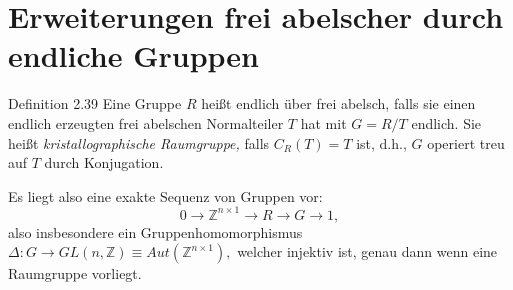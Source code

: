 \documentclass{beamer}
\begin{document}
\section{Erweiterungen frei abelscher durch endliche Gruppen}
\begin{frame}
\begin{block}{Definition 2.39}
Eine Gruppe $R$ heißt endlich über frei abelsch, falls sie einen endlich erzeugten frei abelschen Normalteiler $T$ hat mit $G=R/ T$ endlich. Sie heißt \emph{kristallographische Raumgruppe,} falls $C_R(T)=T$ ist, d.h., $G$ operiert treu auf $T$ durch Konjugation.
\end{block}
\end{frame}
\begin{frame}
Es liegt also eine exakte Sequenz von Gruppen vor:
\[
0 \rightarrow \mathbb{Z}^{n\times 1} \rightarrow R \rightarrow G \rightarrow 1,
\]
also insbesondere ein Gruppenhomomorphismus $\Delta :G\to GL(n,\mathbb{Z})\equiv Aut(\mathbb{Z}^{n\times 1}),$ welcher injektiv ist, genau dann wenn eine Raumgruppe vorliegt.
\end{frame}
\end{document}
